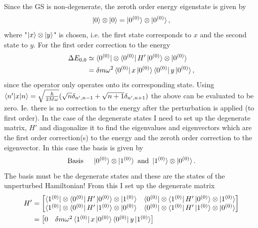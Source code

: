 \begin{example}
\begin{enumerate}
		Since the GS is non-degenerate, the zeroth order energy eigenstate is given by
		\begin{equation}
			\ket{0}\otimes\ket{0}=\ket{0^{(0)}}\otimes\ket{0^{(0)}},
		\end{equation} 
		where "$\ket{x}\otimes\ket{y}$" is chosen, i.e. the first state corresponds to $x$ and the second state to $y$. For the first order correction to the energy
		\begin{equation}
			\begin{split}
				\Delta E_{0,0}&\simeq\bra{0^{(0)}}\otimes\bra{0^{(0)}}H'\ket{0^{(0)}}\otimes\ket{0^{(0)}}\\
				&=\delta m\omega^2\bra{0^{(0)}}x\ket{0^{(0)}}\bra{0^{(0)}}y\ket{0^{(0)}},
			\end{split}
		\end{equation} 
		since the operator only operates onto its corresponding state. Using $\braket{n'|x|n}=\sqrt{\frac{\hbar}{2M\omega}}(\sqrt{n}\delta_{n',n-1}+\sqrt{n+1}\delta_{n',n+1})$ the above can be evaluated to be zero. Ie. there is no correction to the energy after the perturbation is applied (to first order). \newline
		In the case of the degenerate states I need to set up the degenerate matrix, $H'$ and diagonalize it to find the eigenvalues and eigenvectors which are the first order correction(s) to the energy and the zeroth order correction to the eigenvector. In this case the basis is given by
		\begin{equation}
			\mbox{Basis }\quad \ket{0^{(0)}}\otimes\ket{1^{(0)}} \mbox{ and } \ket{1^{(0)}}\otimes\ket{0^{(0)}}.
		\end{equation} 
		The basis must be the degenerate states and these are the states of the unperturbed Hamiltonian! From this I set up the degenerate matrix
		\begin{equation}
			\begin{split}
				H'&=\begin{bmatrix}
					\bra{1^{(0)}}\otimes\bra{0^{(0)}}H'\ket{0^{(0)}}\otimes\ket{1^{(0)}} & \bra{0^{(0)}}\otimes\bra{1^{(0)}}H'\ket{0^{(0)}}\otimes\ket{1^{(0)}}\\
					\bra{1^{(0)}}\otimes\bra{0^{(0)}}H'\ket{1^{(0)}}\otimes\ket{0^{(0)}} & \bra{0^{(0)}}\otimes\bra{1^{(0)}}H'\ket{1^{(0)}}\otimes\ket{0^{(0)}}\\
				\end{bmatrix}\\
				&=\begin{bmatrix}
					0 & \delta m\omega^2\bra{1^{(0)}}x\ket{0^{(0)}}\bra{0^{(0)}}y\ket{1^{(0)}}\\

\end{bmatrix}
\end{split}
\end{equation}
\end{enumerate}
\end{example}
